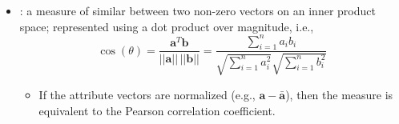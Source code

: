 \begin{itemize}
  \item {}: a measure of similar between two non-zero vectors on an inner product space; represented using a dot product over magnitude, i.e.,
  \[%
  \cos(\theta) = \frac{\bm{a}^T \bm{b}}{||\bm{a}||\,||\bm{b}||}= \frac{\sum_{i = 1}^{n}a_i b_i}{\sqrt{\sum_{i = 1}^{n}a^2_i}\sqrt{\sum_{i = 1}^{n}b^2_i}}
  \]%
    \begin{itemize}
      \item If the attribute vectors are normalized (e.g., \(\bm{a}-\bar{\bm{a}}\)), then the measure is equivalent to the Pearson correlation coefficient.
    \end{itemize}
  
\end{itemize}


